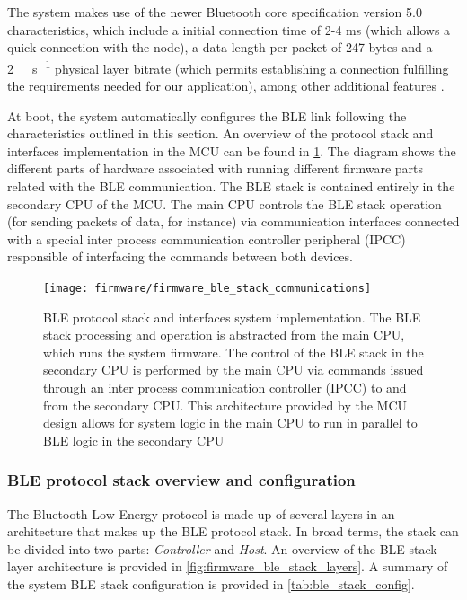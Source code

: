 The system makes use of the newer Bluetooth core specification version 5.0 \cite{Bluetooth52} characteristics, which include a initial connection time of 2-4 ms (which allows a quick connection with the node), a data length per packet of 247 bytes and a \SI{2}{\mega\bit\per\second} physical layer bitrate (which permits establishing a connection fulfilling the requirements needed for our application), among other additional features \cite{Bluetooth52}.

At boot, the system automatically configures the BLE link following the characteristics outlined in this section. An overview of the protocol stack and interfaces implementation in the MCU can be found in \cref{fig:firmware_ble_stack_communications}. The diagram shows the different parts of hardware associated with running different firmware parts related with the BLE communication. The BLE stack is contained entirely in the secondary CPU of the MCU. The main CPU controls the BLE stack operation (for sending packets of data, for instance) via communication interfaces connected with a special inter process communication controller peripheral (IPCC) responsible of interfacing the commands between both devices. %

\begin{figure}[ht]
	\centering
	\texttt{[image: firmware/firmware\_ble\_stack\_communications]}
	\caption{BLE protocol stack and interfaces system implementation. The BLE stack processing and operation is abstracted from the main CPU, which runs the system firmware. The control of the BLE stack in the secondary CPU is performed by the main CPU via commands issued through an inter process communication controller (IPCC) to and from the secondary CPU. This architecture provided by the MCU design allows for system logic in the main CPU to run in parallel to BLE logic in the secondary CPU}
	\label{fig:firmware_ble_stack_communications}
\end{figure}

\subsubsection{BLE protocol stack overview and configuration} \label{sec:ble_stack}

The Bluetooth Low Energy protocol is made up of several layers in an architecture that makes up the BLE protocol stack. In broad terms, the stack can be divided into two parts: \textit{Controller} and \textit{Host}. An overview of the BLE stack layer architecture is provided in \cref{fig:firmware_ble_stack_layers}. A summary of the system BLE stack configuration is provided in \cref{tab:ble_stack_config}.

